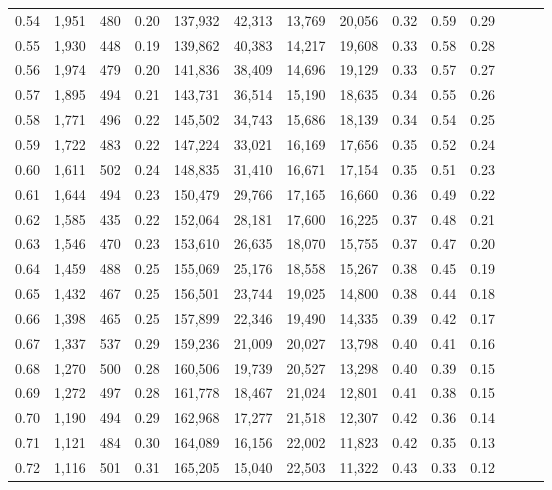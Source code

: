 \begin{tabular}{rrrrrrrrrrrrrr}
0.54 &  1,951 &  480 &  0.20 &  137,932 &   42,313 &  13,769 &  20,056 &  0.32 &  0.59 &      0.29 \\
0.55 &  1,930 &  448 &  0.19 &  139,862 &   40,383 &  14,217 &  19,608 &  0.33 &  0.58 &      0.28 \\
0.56 &  1,974 &  479 &  0.20 &  141,836 &   38,409 &  14,696 &  19,129 &  0.33 &  0.57 &      0.27 \\
0.57 &  1,895 &  494 &  0.21 &  143,731 &   36,514 &  15,190 &  18,635 &  0.34 &  0.55 &      0.26 \\
0.58 &  1,771 &  496 &  0.22 &  145,502 &   34,743 &  15,686 &  18,139 &  0.34 &  0.54 &      0.25 \\
0.59 &  1,722 &  483 &  0.22 &  147,224 &   33,021 &  16,169 &  17,656 &  0.35 &  0.52 &      0.24 \\
0.60 &  1,611 &  502 &  0.24 &  148,835 &   31,410 &  16,671 &  17,154 &  0.35 &  0.51 &      0.23 \\
0.61 &  1,644 &  494 &  0.23 &  150,479 &   29,766 &  17,165 &  16,660 &  0.36 &  0.49 &      0.22 \\
0.62 &  1,585 &  435 &  0.22 &  152,064 &   28,181 &  17,600 &  16,225 &  0.37 &  0.48 &      0.21 \\
0.63 &  1,546 &  470 &  0.23 &  153,610 &   26,635 &  18,070 &  15,755 &  0.37 &  0.47 &      0.20 \\
0.64 &  1,459 &  488 &  0.25 &  155,069 &   25,176 &  18,558 &  15,267 &  0.38 &  0.45 &      0.19 \\
0.65 &  1,432 &  467 &  0.25 &  156,501 &   23,744 &  19,025 &  14,800 &  0.38 &  0.44 &      0.18 \\
0.66 &  1,398 &  465 &  0.25 &  157,899 &   22,346 &  19,490 &  14,335 &  0.39 &  0.42 &      0.17 \\
0.67 &  1,337 &  537 &  0.29 &  159,236 &   21,009 &  20,027 &  13,798 &  0.40 &  0.41 &      0.16 \\
0.68 &  1,270 &  500 &  0.28 &  160,506 &   19,739 &  20,527 &  13,298 &  0.40 &  0.39 &      0.15 \\
0.69 &  1,272 &  497 &  0.28 &  161,778 &   18,467 &  21,024 &  12,801 &  0.41 &  0.38 &      0.15 \\
0.70 &  1,190 &  494 &  0.29 &  162,968 &   17,277 &  21,518 &  12,307 &  0.42 &  0.36 &      0.14 \\
0.71 &  1,121 &  484 &  0.30 &  164,089 &   16,156 &  22,002 &  11,823 &  0.42 &  0.35 &      0.13 \\
0.72 &  1,116 &  501 &  0.31 &  165,205 &   15,040 &  22,503 &  11,322 &  0.43 &  0.33 &      0.12 \\

\end{tabular}
